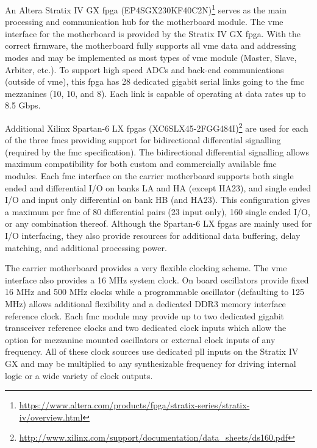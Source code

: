 An Altera Stratix IV GX \gls{fpga} (EP4SGX230KF40C2N)\footnote{\url{https://www.altera.com/products/fpga/stratix-series/stratix-iv/overview.html}} serves as the main processing and communication hub for the motherboard module. The \gls{vme} interface for the motherboard is provided by the Stratix IV GX \gls{fpga}. With the correct firmware, the motherboard fully supports all \gls{vme} data and addressing modes and may be implemented as most types of \gls{vme} module (Master, Slave, Arbiter, etc.). To support high speed ADCs and back-end communications (outside of \gls{vme}), this \gls{fpga} has 28 dedicated gigabit serial links going to the \gls{fmc} mezzanines (10, 10, and 8). Each link is capable of operating at data rates up to 8.5 Gbps.


Additional Xilinx Spartan-6 LX \gls{fpga}s (XC6SLX45-2FGG484I)\footnote{\url{http://www.xilinx.com/support/documentation/data_sheets/ds160.pdf}} are used for each of the three \gls{fmc}s providing support for bidirectional differential signalling (required by the \gls{fmc} specification).
The bidirectional differential signalling allows maximum compatibility for both custom and commercially available \gls{fmc} modules. 
Each \gls{fmc} interface on the carrier motherboard supports both single ended and differential I/O on banks LA and HA (except HA23), and single ended I/O and input only differential on bank HB (and HA23). 
This configuration gives a maximum per \gls{fmc} of 80 differential pairs (23 input only), 160 single ended I/O, or any combination thereof. 
Although the Spartan-6 LX \gls{fpga}s are mainly used for I/O interfacing, they also provide resources for additional data buffering, delay matching, and additional processing power. 

The carrier motherboard provides a very flexible clocking scheme. The \gls{vme} interface also provides a 16 MHz system clock.
On board oscillators provide fixed 16 MHz and 500 MHz clocks while a programmable oscillator (defaulting to 125 MHz) allows additional flexibility and a dedicated DDR3 memory interface reference clock. 
Each \gls{fmc} module may provide up to two dedicated gigabit transceiver reference clocks and two dedicated clock inputs which allow the option for mezzanine mounted oscillators or external clock inputs of any frequency.
All of these clock sources use dedicated \gls{pll} inputs on the Stratix IV GX and may be multiplied to any synthesizable frequency for driving internal logic or a wide variety of clock outputs.


